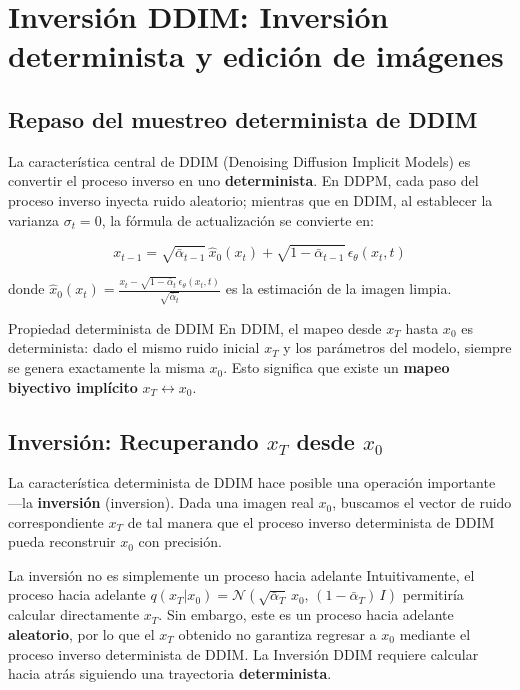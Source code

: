 \documentclass[a4paper]{article}
\begin{document}
\newpage
\section{Inversión DDIM: Inversión determinista y edición de imágenes}

\subsection{Repaso del muestreo determinista de DDIM}

La característica central de DDIM (Denoising Diffusion Implicit Models) es convertir el proceso inverso en uno \textbf{determinista}. En DDPM, cada paso del proceso inverso inyecta ruido aleatorio; mientras que en DDIM, al establecer la varianza $\sigma_t = 0$, la fórmula de actualización se convierte en:

$$
x_{t-1} = \sqrt{\bar\alpha_{t-1}}\,\hat{x}_0(x_t) + \sqrt{1-\bar\alpha_{t-1}}\,\epsilon_\theta(x_t, t)
$$

donde $\hat{x}_0(x_t) = \frac{x_t - \sqrt{1-\bar\alpha_t}\,\epsilon_\theta(x_t, t)}{\sqrt{\bar\alpha_t}}$ es la estimación de la imagen limpia.

\begin{importantbox}{Propiedad determinista de DDIM}
En DDIM, el mapeo desde $x_T$ hasta $x_0$ es determinista: dado el mismo ruido inicial $x_T$ y los parámetros del modelo, siempre se genera exactamente la misma $x_0$. Esto significa que existe un \textbf{mapeo biyectivo implícito} $x_T \leftrightarrow x_0$.
\end{importantbox}

\subsection{Inversión: Recuperando $x_T$ desde $x_0$}

La característica determinista de DDIM hace posible una operación importante —la \textbf{inversión} (inversion). Dada una imagen real $x_0$, buscamos el vector de ruido correspondiente $x_T$ de tal manera que el proceso inverso determinista de DDIM pueda reconstruir $x_0$ con precisión.

\begin{warningbox}{La inversión no es simplemente un proceso hacia adelante}
Intuitivamente, el proceso hacia adelante $q(x_T|x_0) = \mathcal{N}(\sqrt{\bar\alpha_T}\,x_0,\, (1-\bar\alpha_T)\,I)$ permitiría calcular directamente $x_T$. Sin embargo, este es un proceso hacia adelante \textbf{aleatorio}, por lo que el $x_T$ obtenido no garantiza regresar a $x_0$ mediante el proceso inverso determinista de DDIM. La Inversión DDIM requiere calcular hacia atrás siguiendo una trayectoria \textbf{determinista}.
\end{warningbox}
\end{document}
